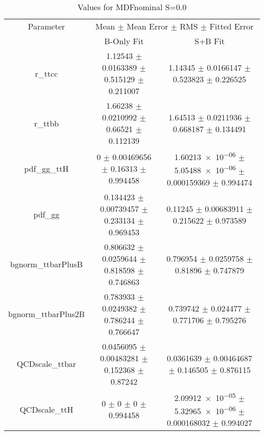 \begin{table}
\centering
\caption{Values for MDFnominal S=0.0}
\begin{tabular}{ccc}
\toprule
Parameter & \multicolumn{2}{c}{Mean $\pm$ Mean Error $\pm$ RMS $\pm$ Fitted Error}\\
 & B-Only Fit & S+B Fit\\
\midrule
r\_ttcc & \num{1.12543} $\pm$ \num{0.0163389} $\pm$ \num{0.515129} $\pm$ \num{0.211007} & \num{1.14345} $\pm$ \num{0.0166147} $\pm$ \num{0.523823} $\pm$ \num{0.226525}\\
r\_ttbb & \num{1.66238} $\pm$ \num{0.0210992} $\pm$ \num{0.66521} $\pm$ \num{0.112139} & \num{1.64513} $\pm$ \num{0.0211936} $\pm$ \num{0.668187} $\pm$ \num{0.134491}\\
pdf\_gg\_ttH & \num{0} $\pm$ \num{0.00469656} $\pm$ \num{0.16313} $\pm$ \num{0.994458} & \num{1.60213e-06} $\pm$ \num{5.05488e-06} $\pm$ \num{0.000159369} $\pm$ \num{0.994474}\\
pdf\_gg & \num{0.134423} $\pm$ \num{0.00739457} $\pm$ \num{0.233134} $\pm$ \num{0.969453} & \num{0.11245} $\pm$ \num{0.00683911} $\pm$ \num{0.215622} $\pm$ \num{0.973589}\\
bgnorm\_ttbarPlusB & \num{0.806632} $\pm$ \num{0.0259644} $\pm$ \num{0.818598} $\pm$ \num{0.746863} & \num{0.796954} $\pm$ \num{0.0259758} $\pm$ \num{0.81896} $\pm$ \num{0.747879}\\
bgnorm\_ttbarPlus2B & \num{0.783933} $\pm$ \num{0.0249382} $\pm$ \num{0.786244} $\pm$ \num{0.766647} & \num{0.739742} $\pm$ \num{0.024477} $\pm$ \num{0.771706} $\pm$ \num{0.795276}\\
QCDscale\_ttbar & \num{0.0456095} $\pm$ \num{0.00483281} $\pm$ \num{0.152368} $\pm$ \num{0.87242} & \num{0.0361639} $\pm$ \num{0.00464687} $\pm$ \num{0.146505} $\pm$ \num{0.876115}\\
QCDscale\_ttH & \num{0} $\pm$ \num{0} $\pm$ \num{0} $\pm$ \num{0.994458} & \num{2.09912e-05} $\pm$ \num{5.32965e-06} $\pm$ \num{0.000168032} $\pm$ \num{0.994027}\\
\bottomrule
\end{tabular}
\end{table}